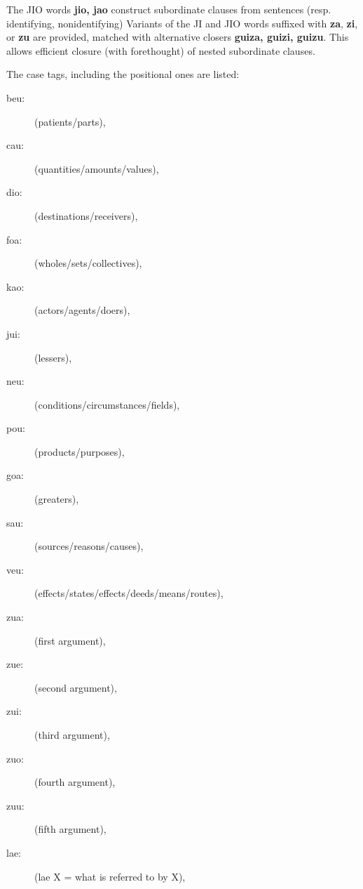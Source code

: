 \documentclass[12pt]{book}
\begin{document}
{\begin{description}
\end{description} 

The JIO words {\bf jio, jao} construct subordinate clauses from sentences (resp. identifying, nonidentifying)  Variants of the
JI and JIO words suffixed with {\bf za}, {\bf zi}, or {\bf zu} are provided, matched with alternative closers
{\bf guiza, guizi, guizu}.  This allows efficient closure (with forethought) of nested subordinate clauses.

The case tags, including the positional ones are listed:  

\begin{description}

\item[beu:] (patients/parts), 

\item[cau:] (quantities/amounts/values), 

\item[dio:] (destinations/receivers), 

\item[foa:] (wholes/sets/collectives), 

\item[kao:] (actors/agents/doers), 

\item[jui:] (lessers),

\item[neu:] (conditions/circumstances/fields), 

\item[pou:] (products/purposes), 

\item[goa:] (greaters), 

\item[sau:] (sources/reasons/causes), 

\item[veu:] (effects/states/effects/deeds/means/routes), 

\item[zua:] (first argument), 

\item[zue:] (second argument), 

\item[zui:] (third argument), 

\item[zuo:] (fourth argument), 

\item[zuu:] (fifth argument), 

\item[lae:] (lae X = what is referred to by X), 


\end{description}}
\end{document}
